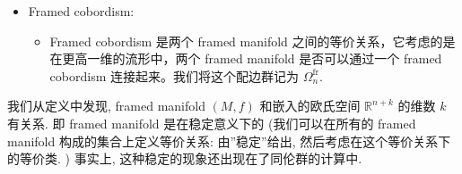 \documentclass[
]{ctexart}
\providecommand{\tightlist}{%
  \setlength{\itemsep}{0pt}\setlength{\parskip}{0pt}}
\begin{document}
\begin{itemize}
\begin{itemize}
\begin{itemize}
      \begin{itemize}
      \item
        法丛关系： 因为 \(M^n\) 嵌在 \(\mathbb{R}^{n+k}\)
        中，它的切丛和法丛的直和一定是整个平坦宇宙的切丛（即平凡丛）：
        \[
          TM \oplus \nu^k \cong \epsilon^{n+k}
          \]
      \item
        稳定可平行化前提： 你假设了 \(M\)
        是稳定可平凡化的。它的代数定义是：只要给切丛加上某个足够大维度
        \(a\) 的平凡丛，它就会变成一个平凡丛： \[
          TM \oplus \epsilon^a \cong \epsilon^{n+a}
          \]
      \item
        我们在第 1 个公式的两边，同时加上一个 \(\epsilon^a\)： \[
          (TM \oplus \epsilon^a) \oplus \nu^k \cong \epsilon^{n+k} \oplus \epsilon^a
          \] 把括号里的东西替换成第 2 个公式的结果： \[
         \epsilon^{n+a} \oplus \nu^k \cong \epsilon^{n+k+a}
         \] 这个公式的白话翻译是： 你的法丛
        \(\nu^k\)，如果再给它强行加上一个极其庞大的平凡向量丛
        \(\epsilon^{n+a}\)，它俩混在一起后，就彻底变成了一个完美的、没有打结的平凡丛！在拓扑学里，这就叫证明了
        \(\nu^k\) 是 ``稳定平凡的 (Stably trivial)''。
      \end{itemize}
    \end{itemize}
  \item
    并不是所有的流形上都可以定义 frame. 球面 \(S^n\) 上可以定义 frame.
    同伦球面上也可以定义 frame.
  \end{itemize}
\item
  Framed cobordism:

  \begin{itemize}
  \tightlist
  \item
    Framed cobordism 是两个 framed manifold
    之间的等价关系，它考虑的是在更高一维的流形中，两个 framed manifold
    是否可以通过一个 framed cobordism 连接起来。我们将这个配边群记为
    \(\Omega^{\text{fr}}_n\).
  \end{itemize}
\end{itemize}

我们从定义中发现, framed manifold \(\left(M,f\right)\) 和嵌入的欧氏空间
\(\mathbb{R}^{n+k}\) 的维数 \(k\) 有关系. 即 framed manifold
是在稳定意义下的 (我们可以在所有的 framed manifold
构成的集合上定义等价关系: 由''稳定''给出,
然后考虑在这个等价关系下的等价类. ) 事实上,
这种稳定的现象还出现在了同伦群的计算中.
\end{document}
